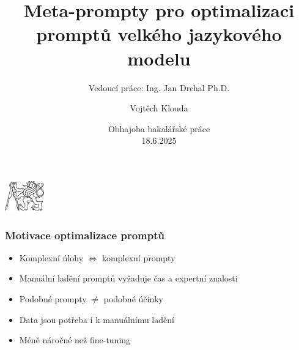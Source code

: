 \documentclass[aspectratio=169]{beamer}
\author{Vojtěch Klouda}
\title{Meta-prompty pro optimalizaci promptů velkého jazykového modelu}
\subtitle{Vedoucí práce: Ing. Jan Drchal Ph.D.}
\date[Event]{Obhajoba bakalářské práce\\18.6.2025}
\begin{document}
\begin{frame}
	\titlepage
	\begin{center}
  		\includegraphics[height=1.3cm]{ctu_logo_black.pdf}
	\end{center}
\end{frame}








\begin{frame}
	\frametitle{Motivace optimalizace promptů}
	\begin{itemize}
		\item Komplexní úlohy $\iff$ komplexní prompty
		\item Manuální ladění promptů vyžaduje čas a expertní znalosti
		\item Podobné prompty $\neq$ podobné účinky
		\item Data jsou potřeba i k manuálnímu ladění
		\item Méně náročné než fine-tuning
	\end{itemize}
\end{frame}		
\end{document}
